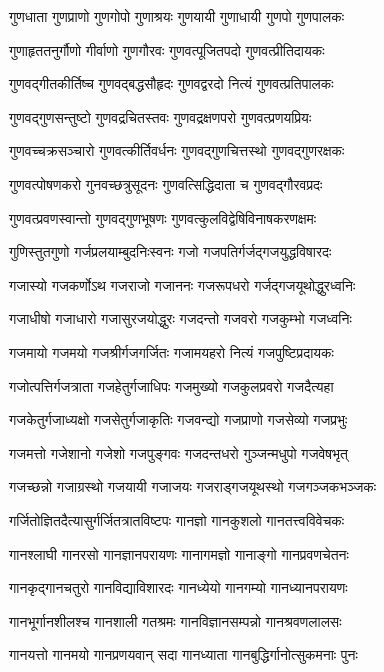 \twolineshloka
{गुणधाता गुणप्राणो गुणगोपो गुणाश्रयः}%
{गुणयायी गुणाधायी गुणपो गुणपालकः}%

\twolineshloka
{गुणाहृततनुर्गौणो गीर्वाणो गुणगौरवः}%
{गुणवत्पूजितपदो गुणवत्प्रीतिदायकः}%

\twolineshloka
{गुणवद्गीतकीर्तिष्च गुणवद्बद्धसौहृदः}%
{गुणवद्वरदो नित्यं गुणवत्प्रतिपालकः}%

\twolineshloka
{गुणवद्गुणसन्तुष्टो गुणवद्रचितस्तवः}%
{गुणवद्रक्षणपरो गुणवत्प्रणयप्रियः}%

\twolineshloka
{गुणवच्चक्रसञ्चारो गुणवत्कीर्तिवर्धनः}%
{गुणवद्गुणचित्तस्थो गुणवद्गुणरक्षकः}%

\twolineshloka
{गुणवत्पोषणकरो गुनवच्छत्रुसूदनः}%
{गुणवत्सिद्धिदाता च गुणवद्गौरवप्रदः}%

\twolineshloka
{गुणवत्प्रवणस्वान्तो गुणवद्गुणभूषणः}%
{गुणवत्कुलविद्वेषिविनाषकरणक्षमः}%

\twolineshloka
{गुणिस्तुतगुणो गर्जप्रलयाम्बुदनिःस्वनः}%
{गजो गजपतिर्गर्जद्गजयुद्धविषारदः}%

\twolineshloka
{गजास्यो गजकर्णोऽथ गजराजो गजाननः}%
{गजरूपधरो गर्जद्गजयूथोद्धुरध्वनिः}%

\twolineshloka
{गजाधीषो गजाधारो गजासुरजयोद्धुरः}%
{गजदन्तो गजवरो गजकुम्भो गजध्वनिः}%

\twolineshloka
{गजमायो गजमयो गजश्रीर्गजगर्जितः}%
{गजामयहरो नित्यं गजपुष्टिप्रदायकः}%

\twolineshloka
{गजोत्पत्तिर्गजत्राता गजहेतुर्गजाधिपः}%
{गजमुख्यो गजकुलप्रवरो गजदैत्यहा}%

\twolineshloka
{गजकेतुर्गजाध्यक्षो गजसेतुर्गजाकृतिः}%
{गजवन्द्यो गजप्राणो गजसेव्यो गजप्रभुः}%

\twolineshloka
{गजमत्तो गजेशानो गजेशो गजपुङ्गवः}%
{गजदन्तधरो गुञ्जन्मधुपो गजवेषभृत्}%

\twolineshloka
{गजच्छन्नो गजाग्रस्थो गजयायी गजाजयः}%
{गजराड्गजयूथस्थो गजगञ्जकभञ्जकः}%

\twolineshloka
{गर्जितोज्ञितदैत्यासुर्गर्जितत्रातविष्टपः}%
{गानज्ञो गानकुशलो गानतत्त्वविवेचकः}%

\twolineshloka
{गानश्लाघी गानरसो गानज्ञानपरायणः}%
{गानागमज्ञो गानाङ्गो गानप्रवणचेतनः}%

\twolineshloka
{गानकृद्गानचतुरो गानविद्याविशारदः}%
{गानध्येयो गानगम्यो गानध्यानपरायणः}%

\twolineshloka
{गानभूर्गानशीलश्च गानशाली गतश्रमः}%
{गानविज्ञानसम्पन्नो गानश्रवणलालसः}%

\twolineshloka
{गानयत्तो गानमयो गानप्रणयवान् सदा}%
{गानध्याता गानबुद्धिर्गानोत्सुकमनाः पुनः}%

